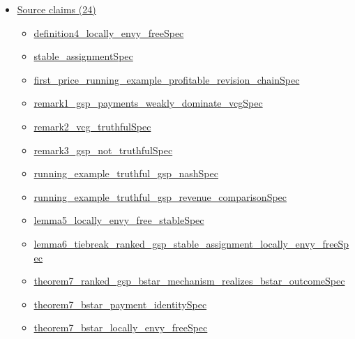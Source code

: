 \documentclass[10pt]{article}
\begin{document}
\begin{itemize}[leftmargin=1.2em]
\begin{itemize}[leftmargin=1.2em]
\item \hyperlink{library-prerequisite-73b6e3a10dffe03a}{EconCSLib.Auction.paper\_theorem8\_bstar\_ranked\_threshold\_strict\_ordered\_local\_optimality\_certificate\_of\_strict\_values}
\item \hyperlink{library-prerequisite-c4448c9d231aa13e}{EconCSLib.Auction.paper\_theorem8\_terminal\_dropout\_record\_outcome}
\item \hyperlink{library-prerequisite-d52cfdfecd6f4903}{EconCSLib.Auction.paper\_theorem8\_bstar\_ranked\_threshold\_terminal\_record\_source\_extensive\_dynamic\_game\_of\_states}
\end{itemize}
\item \hyperlink{source-section-f10b5f68e4acf3dc}{Source claims (24)}
\begin{itemize}[leftmargin=1.2em]
\item \hyperlink{source-claim-a906cbcbb07339a8}{definition4\_locally\_envy\_freeSpec}
\item \hyperlink{source-claim-ce8f50923b43bde9}{stable\_assignmentSpec}
\item \hyperlink{source-claim-5f5dbcc78d92e09e}{first\_price\_running\_example\_profitable\_revision\_chainSpec}
\item \hyperlink{source-claim-356b8731e456c635}{remark1\_gsp\_payments\_weakly\_dominate\_vcgSpec}
\item \hyperlink{source-claim-912ce3e72e5aabde}{remark2\_vcg\_truthfulSpec}
\item \hyperlink{source-claim-1951070cd567204e}{remark3\_gsp\_not\_truthfulSpec}
\item \hyperlink{source-claim-5798ec623309f406}{running\_example\_truthful\_gsp\_nashSpec}
\item \hyperlink{source-claim-110a524c6dbd4f91}{running\_example\_truthful\_gsp\_revenue\_comparisonSpec}
\item \hyperlink{source-claim-3508b3bd2381879e}{lemma5\_locally\_envy\_free\_stableSpec}
\item \hyperlink{source-claim-68ba4a4971219ea9}{lemma6\_tiebreak\_ranked\_gsp\_stable\_assignment\_locally\_envy\_freeSpec}
\item \hyperlink{source-claim-18fbf7fc2d5e0b6c}{theorem7\_ranked\_gsp\_bstar\_mechanism\_realizes\_bstar\_outcomeSpec}
\item \hyperlink{source-claim-c52506a4136e9a4c}{theorem7\_bstar\_payment\_identitySpec}
\item \hyperlink{source-claim-a33014203291a1ce}{theorem7\_bstar\_locally\_envy\_freeSpec}

\end{itemize}
\end{itemize}
\end{document}
